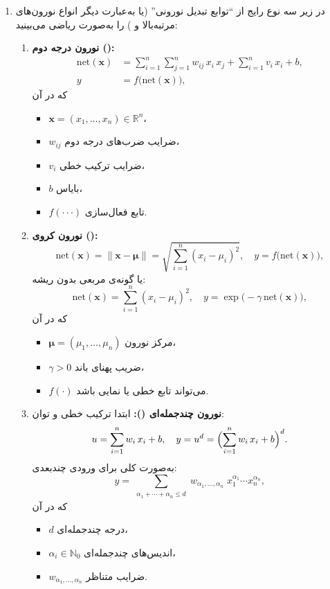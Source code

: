 \begin{enumerate}
	\item در زیر سه نوع رایج از “توابع تبدیل نورونی” (یا به‌عبارت دیگر انواع نورون‌های مرتبه‌بالا و ) را به‌صورت ریاضی می‌بینید:
	\begin{enumerate}
		\item \textbf{نورون درجه دوم ():}
		\[
		\begin{aligned}
			\mathrm{net}(\mathbf{x})
			&= \sum_{i=1}^n \sum_{j=1}^n w_{ij}\,x_i\,x_j
			+ \sum_{i=1}^n v_i\,x_i
			+ b,\\
			y &= f\bigl(\mathrm{net}(\mathbf{x})\bigr),
		\end{aligned}
		\]
		که در آن
		\begin{itemize}
			\item $\mathbf{x}=(x_1,\dots,x_n)\in\mathbb{R}^n$،
			\item $w_{ij}$ ضرایب ضرب‌های درجه دوم،
			\item $v_i$ ضرایب ترکیب خطی،
			\item $b$ بایاس،
			\item $f(\cdot\cdot\cdot)$ تابع فعال‌سازی.
		\end{itemize}
		
		\item \textbf{نورون کروی ():}
		\[
		\mathrm{net}(\mathbf{x})
		= \bigl\lVert \mathbf{x} - \boldsymbol{\mu}\bigr\rVert
		= \sqrt{\sum_{i=1}^n (x_i - \mu_i)^2},
		\quad
		y = f\bigl(\mathrm{net}(\mathbf{x})\bigr),
		\]
		یا گونه‌ی مربعی بدون ریشه:
		\[
		\mathrm{net}(\mathbf{x})
		= \sum_{i=1}^n (x_i - \mu_i)^2,
		\quad
		y = \exp\bigl(-\gamma\,\mathrm{net}(\mathbf{x})\bigr),
		\]
		که در آن
		\begin{itemize}
			\item $\boldsymbol{\mu}=(\mu_1,\dots,\mu_n)$ مرکز نورون،
			\item $\gamma>0$ ضریب پهنای باند،
			\item $f(\cdot)$ می‌تواند تابع خطی یا نمایی باشد.
		\end{itemize}
		
		\item \textbf{نورون چندجمله‌ای ():}
		ابتدا ترکیب خطی و توان:
		\[
		u = \sum_{i=1}^n w_i\,x_i + b,
		\quad
		y = u^d
		= \Bigl(\sum_{i=1}^n w_i\,x_i + b\Bigr)^{d}.
		\]
		به‌صورت کلی برای ورودی چندبعدی:
		\[
		y 
		= \sum_{\substack{\alpha_1+\cdots+\alpha_n \le d}}
		w_{\alpha_1,\dots,\alpha_n}
		\;x_1^{\alpha_1}\cdots x_n^{\alpha_n},
		\]
		که در آن
		\begin{itemize}
			\item $d$ درجه چندجمله‌ای،
			\item $\alpha_i\in\mathbb{N}_0$ اندیس‌های چندجمله‌ای،
			\item $w_{\alpha_1,\dots,\alpha_n}$ ضرایب متناظر.
		\end{itemize}
	\end{enumerate}
	

\end{enumerate}
